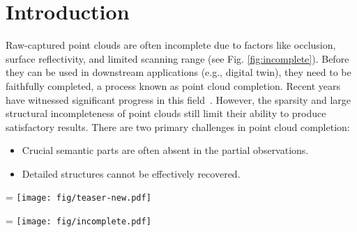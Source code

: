 \section{Introduction}
Raw-captured point clouds are often incomplete due to factors like occlusion, surface reflectivity, and limited scanning range (see Fig. \ref{fig:incomplete}). Before they can be used in downstream applications (e.g., digital twin), they need to be faithfully completed, a process known as point cloud completion. Recent years have witnessed significant progress in this field~\citep{yuan2018pcn,huang2020pf,zhang2020detail,yu2021pointr,9928787,yan2022fbnet,zhang2022shape,tang2022lake,zhou2022seedformer,zhang2022point,10232862,SCRN}. 
However, the sparsity and large structural incompleteness of point clouds still limit their ability to produce satisfactory results. There are two primary challenges in point cloud completion:
\begin{itemize}
    \item Crucial semantic parts are often absent in the partial observations.
    \item Detailed structures cannot be effectively recovered.
\end{itemize} 


\begin{figure*}[h]
    \hsize=\textwidth
    \centering
    \texttt{[image: fig/teaser-new.pdf]}
    \caption{We explore Self-structure Augmentation, a novel strategy for high-quality global-to-local point cloud completion, dubbed PointSea.  (a) In the global stage, PointSea understands incomplete shapes from self-projected multiple views. (b) In the local stage, PointSea collaborates both similar geometric similarities in input (red boxes) and learned shape priors (green boxes) for shape refinement. (c) PointSea shows clear improvements over its competitors, including SeedFormer~\citep{zhou2022seedformer}, AdaPoinTr~\citep{10232862}, and SVDFormer~\citep{Zhu_2023_ICCV}.}
    \label{fig:teaser}
\end{figure*}
\begin{figure*}[h]
    \hsize=\textwidth
    \centering
    \texttt{[image: fig/incomplete.pdf]}
    \caption{The original point cloud of large and complex objects is often incomplete due to many factors. Point cloud completion plays an essential role in extensive practical applications.}
    \label{fig:incomplete}
\end{figure*}


